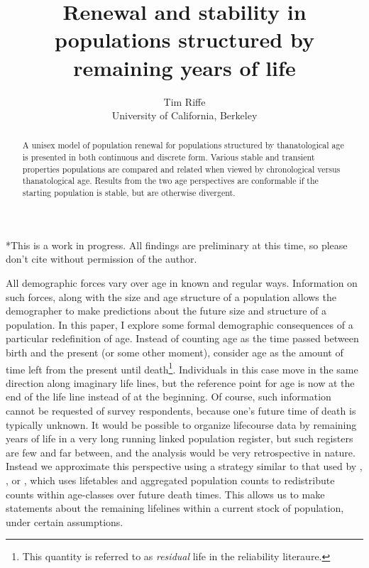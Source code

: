 \documentclass{article}
\begin{document}
\title{Renewal and stability in populations structured by remaining
years of life}
\author{Tim Riffe \\ University of California, Berkeley}
\maketitle

\begin{abstract}
A unisex model of population renewal for populations structured by
thanatological age is presented in both continuous and discrete form. Various
stable and transient properties populations are compared and related when viewed
by chronological versus thanatological age. Results from the two age perspectives are conformable if the starting
population is stable, but are otherwise divergent.
\end{abstract}

*This is a work in progress. All findings are preliminary at this time, so
please don't cite without permission of the author.
\vspace{2em}

All demographic forces vary over age in known and regular ways. Information on
such forces, along with the size and age structure of a population allows the
demographer to make predictions about the future size and structure of a population. In this
paper, I explore some formal demographic consequences of a particular
redefinition of age. Instead of counting age as the time passed between birth and the present (or
some other moment), consider age as the amount of time left from the present
until death\footnote{This quantity is referred to as \textit{residual} life in
the reliability literaure.}.
Individuals in this case move in the same direction along imaginary life lines, but the reference point for age is now at the end of the
life line instead of at the beginning. Of course, such information cannot be
requested of survey respondents,
because one's future time of death is typically unknown. It would be
possible to organize lifecourse data by remaining years of life in a
very long running linked population register, but such registers are few and far
between, and the analysis would be very retrospective in nature.
Instead we approximate this perspective using a strategy similar to that used by
\citet{brouard1986structure}, \citet{miller2001increasing}, or
\citet{lee2002approach}, which uses lifetables and aggregated population counts to redistribute counts within age-classes over
future death times. This allows us to make statements about the remaining
lifelines within a current stock of population, under certain assumptions.
\end{document}
